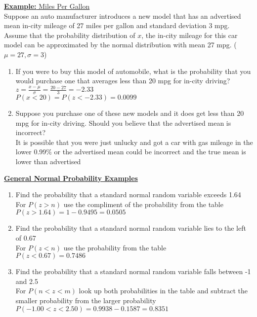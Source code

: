 \documentclass[a4paper]{article}
\let\bf\textbf
\begin{document}
\begin{shaded}
    \underline{\bf{Example:} Miles Per Gallon}
    \vspace{2mm}\\
    Suppose an auto manufacturer introduces a new model that has an advertised mean in-city mileage of 27 miles per gallon and standard deviation 3 mpg. Assume that the probability distribution of $x$, the in-city mileage for this car model can be approximated by the normal distribution with mean 27 mpg. ($\mu = 27, \sigma = 3$)
    \begin{enumerate}
        \item If you were to buy this model of automobile, what is the probability that you would purchase one that averages less than 20 mpg for in-city driving?
        \vspace{1mm}\\
        $\displaystyle z = \frac{x - \mu}{\sigma} = \frac{20 - 27}{3} = -2.33$
        \vspace{1mm}\\
        $P(x < 20) = P(z < -2.33) = 0.0099$
        \item Suppose you purchase one of these new models and it does get less than 20 mpg for in-city driving. Should you believe that the advertised mean is incorrect?
        \vspace{1mm}\\
        It is possible that you were just unlucky and got a car with gas mileage in the lower 0.99\% or the advertised mean could be incorrect and the true mean is lower than advertised 
    \end{enumerate}
\end{shaded}

\begin{shaded}
    \underline{\bf{General Normal Probability Examples}}
    \begin{enumerate}
        \item Find the probability that a standard normal random variable exceeds 1.64
        \vspace{1mm}\\
        For $P(z > n)$ use the compliment of the probability from the table\\
        $P(z > 1.64) = 1 - 0.9495 = 0.0505$
        \item Find the probability that a standard normal random variable lies to the left of 0.67
        \vspace{1mm}\\
        For $P(z < n)$ use the probability from the table\\
        $P(z < 0.67) = 0.7486$
        \item Find the probability that a standard normal random variable falls between -1 and 2.5
        \vspace{1mm}\\
        For $P(n < z < m)$ look up both probabilities in the table and subtract the smaller probability from the larger probability\\
        $P(-1.00 < z < 2.50) = 0.9938 - 0.1587 = 0.8351$
    \end{enumerate}
\end{shaded}
\end{document}
